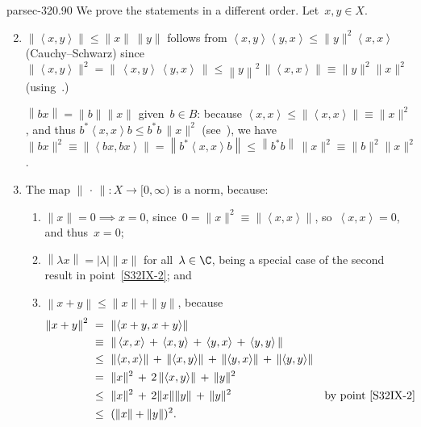 \documentclass[b5page]{book}
\begin{document}
\begin{solution}{parsec-320.90}%
We prove the statements in a different order.
Let~$x,y\in X$.
\begin{enumerate}
\setcounter{enumi}{1}
\item
\label{S32IX-2}
$\left\|\left<x,y\right>\right\|\leq \|x\|\,\|y\|$
follows from  $\left<x,y\right>\left<y,x\right>
\leq \|y\|^2\left<x,x\right>$
(Cauchy--Schwarz)
since
$\|\left<x,y\right>\|^2
=\left\|\,\left<x,y\right>\,\left<y,x\right>\,\right\|
\leq \left\|y\right\|^2\,\left\|\left<x,x\right>\right\|
\equiv \|y\|^2\|x\|^2$
(using~.)

$\left\|bx\right\|=\|b\|\|x\|$ given~$b\in B$:
because $\left<x,x\right>\leq \left\|\left<x,x\right>\right\|
\equiv \|x\|^2$,
and
thus $b^*\left<x,x\right>b \leq b^*b\,\|x\|^2$
(see~),
we have
$\|bx\|^2
\equiv \left\|\left<bx,bx\right>\right\|
= \left\|b^*\left<x,x\right>b\right\|
\leq \left\|b^*b\right\|\,\|x\|^2
\equiv \|b\|^2\|x\|^2$.

\setcounter{enumi}{0}
\item
The map $\|\,\cdot\,\|\colon X\to [0,\infty)$
is a norm, because:
\begin{enumerate}
\item
$\|x\|=0\implies x=0$,
since~$0=\|x\|^2\equiv\|\left<x,x\right>\|$,
so~$\left<x,x\right>=0$,
and thus~$x=0$;

\item
$\left\|\lambda x\right\|=\left|\lambda\right|\|x\|$
for all~$\lambda\in \C$,
being a special case of the second
result in point~\ref{S32IX-2}; and

\item
$\left\|x+y\right\|\leq\|x\|+\|y\|$, 
because
\begin{alignat*}{3}
\left\|x+y\right\|^2 \ &=\ \left\|\left<x+y,x+y\right>\right\|\\
&\equiv\ \left\|\,
\left<x,x\right>\,+\,
\left<x,y\right>\,+\,
\left<y,x\right>\,+\,
\left<y,y\right>\,\right\| \\
&\leq\ 
\left\|\left<x,x\right>\right\| \,+\, 
\left\|\left<x,y\right>\right\| \,+\, 
\left\|\left<y,x\right>\right\| \,+\, 
\left\|\left<y,y\right>\right\|\\
&=\ 
\|x\|^2 \,+\, 2\left\|\left<x,y\right>\right\| \,+\, \|y\|^2\\
&\leq\ 
\|x\|^2 \,+\, 2\|x\|\|y\| \,+\, \|y\|^2
&&\text{by point~\ref{S32IX-2}}\\
&\leq\ 
(\|x\|+\|y\|)^2.
\end{alignat*}
\end{enumerate}
\end{enumerate}
\end{solution}
\end{document}
